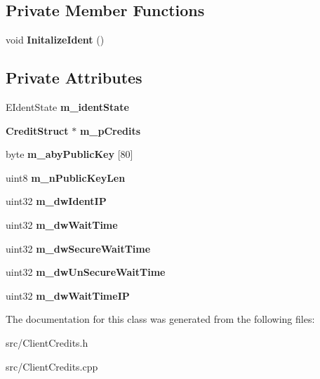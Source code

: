 \subsection*{Private Member Functions}
\begin{DoxyCompactItemize}
\item 
void {\bfseries InitalizeIdent} ()\label{classCClientCredits_a860f6006964a9a4fb6adbd3853e28828}

\end{DoxyCompactItemize}
\subsection*{Private Attributes}
\begin{DoxyCompactItemize}
\item 
EIdentState {\bfseries m\_\-identState}\label{classCClientCredits_a713738e0277f26cae241b9fb5cfbd6aa}

\item 
{\bf CreditStruct} $\ast$ {\bfseries m\_\-pCredits}\label{classCClientCredits_a4b647cd00dc1b4f7b60ebb335ae1088e}

\item 
byte {\bfseries m\_\-abyPublicKey} [80]\label{classCClientCredits_a8be443a8d38d0ff48d3a7af1752346d3}

\item 
uint8 {\bfseries m\_\-nPublicKeyLen}\label{classCClientCredits_ad814cd183e4873e3b29654e7802fc31c}

\item 
uint32 {\bfseries m\_\-dwIdentIP}\label{classCClientCredits_aaa17d742ee02c8ae79b78d0c06e81d6c}

\item 
uint32 {\bfseries m\_\-dwWaitTime}\label{classCClientCredits_ac3037010c4f6aab09f562269b06176f2}

\item 
uint32 {\bfseries m\_\-dwSecureWaitTime}\label{classCClientCredits_a717e7164eb1974aedd5c02d84779665e}

\item 
uint32 {\bfseries m\_\-dwUnSecureWaitTime}\label{classCClientCredits_ad09f2feef361535a613ac9bd7ca3750e}

\item 
uint32 {\bfseries m\_\-dwWaitTimeIP}\label{classCClientCredits_a0104ba854bd727237f1bfdaa07de87df}

\end{DoxyCompactItemize}


The documentation for this class was generated from the following files:\begin{DoxyCompactItemize}
\item 
src/ClientCredits.h\item 
src/ClientCredits.cpp\end{DoxyCompactItemize}
